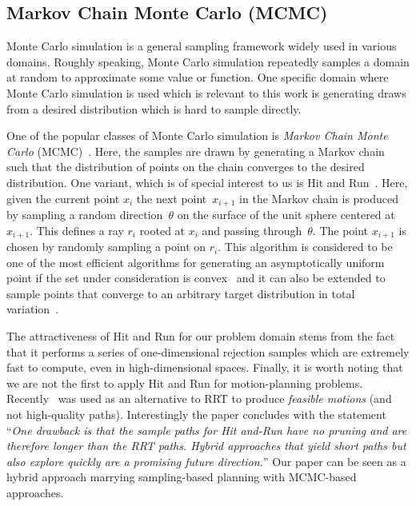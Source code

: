 \documentclass[letterpaper, 10 pt, conference]{ieeeconf}  %
\begin{document}
\subsection{Markov Chain Monte Carlo (MCMC)}
\label{subsec:mcmc}
Monte Carlo simulation is a general sampling framework widely used in various domains. %
Roughly speaking, Monte Carlo simulation repeatedly samples a domain at random to approximate some value or function.
One specific domain where Monte Carlo simulation is used which is relevant to this work is generating draws from a desired distribution which is hard to sample directly.

One of the popular classes of Monte Carlo simulation is 
\emph{Markov Chain Monte Carlo} (MCMC)~\cite{ADDJ03}.
Here, the samples are drawn by generating a Markov chain such that the distribution of points on the chain converges to the desired distribution.
One variant, which is of special interest to us is 
Hit and Run~\cite{KSZ11}.
Here, given the current point $x_i$ the next point~$x_{i+1}$ in the Markov chain is produced by sampling a random direction~$\theta$ on the surface of the unit sphere centered at $x_{i+1}$. This defines a ray $r_i$ rooted at $x_i$ and passing through~$\theta$. The point $x_{i+1}$ is chosen by randomly sampling a point on $r_i$.
This algorithm is considered to be one of the most efficient algorithms for generating an asymptotically uniform point if the set under consideration is convex~\cite{LV06}
and it can also be extended to sample points that converge to an arbitrary target distribution in total variation~\cite{RS94}.

The attractiveness of Hit and Run for our problem domain stems from the fact that it performs a series of one-dimensional rejection samples which are extremely fast to compute, even in high-dimensional spaces. 
Finally, it is worth noting that we are not the first to apply Hit and Run for motion-planning problems.
Recently~\cite{YPVA17} was used as an alternative to RRT to produce \emph{feasible motions} (and not high-quality paths). 
Interestingly the paper concludes with the statement ``\emph{One drawback is that the sample paths for Hit and-Run have no pruning and are therefore longer than the RRT paths. Hybrid approaches that yield short paths but also explore quickly are a promising future direction.}''
Our paper can be seen as a hybrid approach marrying sampling-based planning with MCMC-based approaches.
\end{document}
